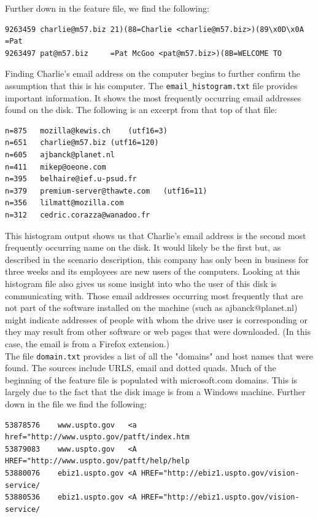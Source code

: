 Further down in the feature file, we find the following:
\lstset{style=customfile}
\begin{lstlisting}
9263459	charlie@m57.biz	21)(88=Charlie <charlie@m57.biz>)(89\x0D\x0A    =Pat 
9263497	pat@m57.biz	    =Pat McGoo <pat@m57.biz>)(8B=WELCOME TO
\end{lstlisting}

Finding Charlie's email address on the computer begins to further confirm the assumption that this is his computer. The \texttt{email\_histogram.txt} file provides important information. It shows the most frequently occurring email addresses found on the disk. The following is an excerpt from that top of that file:
\lstset{style=customfile}
\begin{lstlisting}
n=875	mozilla@kewis.ch	(utf16=3)
n=651	charlie@m57.biz	(utf16=120)
n=605	ajbanck@planet.nl
n=411	mikep@oeone.com
n=395	belhaire@ief.u-psud.fr
n=379	premium-server@thawte.com	(utf16=11)
n=356	lilmatt@mozilla.com
n=312	cedric.corazza@wanadoo.fr
\end{lstlisting}
This histogram output shows us that Charlie's email address is the second most frequently occurring name on the disk. It would likely be the first but, as described in the scenario description, this company has only been in business for three weeks and its employees are new users of the computers. Looking at this histogram file also gives us some insight into who the user of this disk is communicating with. Those email addresses occurring most frequently that are not part of the software installed on the machine (such as ajbanck@planet.nl) might indicate addresses of people with whom the drive user is corresponding or they may result from other software or web pages that were downloaded. (In this case, the email is from a Firefox extension.)\\

The file \texttt{domain.txt} provides a list of all the "domains" and host names that were found. The sources include URLS, email and dotted quads. Much of the beginning of the feature file is populated with microsoft.com domains. This is largely due to the fact that the disk image is from a Windows machine. Further down in the file we find the following:
\lstset{style=customfile}
\begin{lstlisting}
53878576	www.uspto.gov	<a href="http://www.uspto.gov/patft/index.htm
53879083	www.uspto.gov	<A HREF="http://www.uspto.gov/patft/help/help
53880076	ebiz1.uspto.gov	<A HREF="http://ebiz1.uspto.gov/vision-service/
53880536	ebiz1.uspto.gov	<A HREF="http://ebiz1.uspto.gov/vision-service/
\end{lstlisting}

